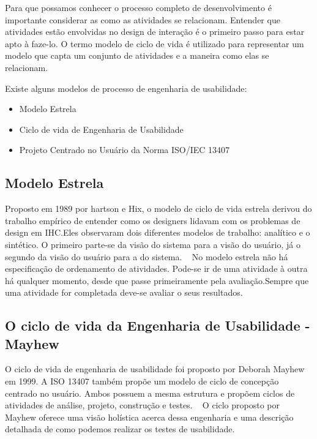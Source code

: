	Para que possamos conhecer o processo completo de desenvolvimento é importante considerar as como as atividades se relacionam. Entender que atividades estão envolvidas no design de interação é o primeiro passo para estar apto à faze-lo.
	O termo modelo de ciclo de vida é utilizado para representar um modelo que capta um conjunto de atividades e a maneira como elas se relacionam. ~\cite{preece2005}

	Existe alguns modelos de processo de engenharia de usabilidade:

\begin{itemize}
\item Modelo Estrela
\item Ciclo de vida de Engenharia de Usabilidade
\item Projeto Centrado no Usuário da Norma ISO/IEC 13407
\end{itemize}

\subsection{Modelo Estrela}

	Proposto em 1989 por hartson e Hix, o modelo de ciclo de vida estrela derivou do trabalho empírico de entender como os designers lidavam com os problemas de design em IHC.Eles observaram dois diferentes modelos de trabalho: analítico e o sintético. O primeiro parte-se da visão do sistema para a visão do usuário, já o segundo da visão do usuário para a do sistema. ~\cite{cybis2010}
	No modelo estrela não há especificação de ordenamento de atividades. Pode-se ir de uma atividade à outra há qualquer momento, desde que passe primeiramente pela avaliação.Sempre que uma atividade for completada deve-se avaliar o seus resultados.


\subsection{O ciclo de vida da Engenharia de Usabilidade - Mayhew}

	O ciclo de vida de engenharia de usabilidade foi proposto por Deborah Mayhew em 1999. A ISO 13407 também propõe um modelo de ciclo de concepção centrado no usuário. Ambos possuem a mesma estrutura e propõem ciclos de atividades de análise, projeto, construção e testes. ~\cite{cybis2010}
	O ciclo proposto por Mayhew oferece uma visão holística acerca dessa engenharia e uma descrição detalhada de como podemos realizar os testes de usabilidade. ~\cite{preece2005}

